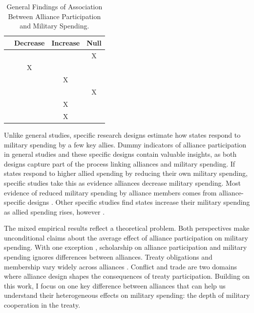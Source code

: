 \documentclass[12pt]{article}
\begin{document}
\begin{table}[hbt!]
\begin{center}
\begin{tabular}{lccc}
     & Decrease & Increase & Null \\
\hline
\citet{MostSiverson1987} &  &  & X \\
\citet{Conybeare1994} & X & &  \\
\citet{Diehl1994} &  & X &  \\
\citet{Goldsmith2003} &  &  & X \\
\citet{MorganPalmer2006} &  & X & \\ 
\citet{QuirozFlores2011} &  & X &  \\ 
\hline
\end{tabular}
\caption{General Findings of Association Between Alliance Participation and Military Spending.}
\label{tab:results-sum}
\end{center} 
\end{table}


Unlike general studies, specific research designs estimate how states respond to military spending by a few key allies.
Dummy indicators of alliance participation in general studies and these specific designs contain valuable insights, as both designs capture part of the process linking alliances and military spending. 
If states respond to higher allied spending by reducing their own military spending, specific studies take this as evidence alliances decrease military spending. 
Most evidence of reduced military spending by alliance members comes from alliance-specific designs \citep{BarnettLevy1991, Morrow1993, Sorokin1994, PluemperNeumayer2015, GeorgeSandler2017}.
Other specific studies find states increase their military spending as allied spending rises, however \citep{ConybeareSandler1990, Chenetal1996}. 


The mixed empirical results reflect a theoretical problem. 
Both perspectives make unconditional claims about the average effect of alliance participation on military spending.  
With one exception \citep{DigiuseppePoast2016}, scholarship on alliance participation and military spending ignores differences between alliances.
Treaty obligations and membership vary widely across alliances \citep{Leedsetal2002}. 
Conflict \citep{Leeds2003, Benson2012} and trade \citep{Long2003, LongLeeds2006} are two domains where alliance design shapes the consequences of treaty participation. 
Building on this work, I focus on one key difference between alliances that can help us understand their heterogeneous effects on military spending: the depth of military cooperation in the treaty.
\end{document}
